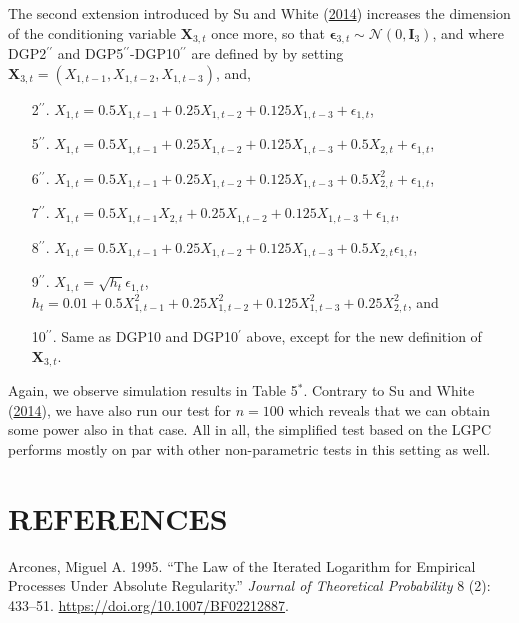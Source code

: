 \documentclass[
  12pt,
  letterpaper]{article}
\providecommand{\tightlist}{%
  \setlength{\itemsep}{0pt}\setlength{\parskip}{0pt}}
\numberwithin{equation}{section}
\newcommand{\X}{\bm{X}}
\newcommand{\fepsilon}{\bm{\epsilon}}
\begin{document}
The second extension introduced by Su and White (\protect\hyperlink{ref-su2014testing}{2014}) increases the dimension of the conditioning variable \(\X_{3,t}\) once more, so that \(\fepsilon_{3,t} \sim \mathcal{N}(0, \bm{I}_3)\), and where DGP2\(^{\prime\prime}\) and DGP5\(^{\prime\prime}\)-DGP10\(^{\prime\prime}\) are defined by by setting \(\X_{3,t} = (X_{1, t-1}, X_{1, t-2}, X_{1, t-3})\), and,

\begin{itemize}
\tightlist
\item[2$^{\prime\prime}$.] $X_{1,t} = 0.5X_{1,t-1} + 0.25X_{1, t-2} + 0.125X_{1,t-3} + \epsilon_{1,t}$,
\item[5$^{\prime\prime}$.] $X_{1,t} = 0.5X_{1,t-1} + 0.25X_{1, t-2} + 0.125X_{1,t-3} + 0.5X_{2,t} + \epsilon_{1,t}$,
\item[6$^{\prime\prime}$.] $X_{1,t} = 0.5X_{1,t-1} + 0.25X_{1, t-2} + 0.125X_{1,t-3} + 0.5X_{2,t}^2 + \epsilon_{1,t}$,
\item[7$^{\prime\prime}$.] $X_{1,t} = 0.5X_{1,t-1}X_{2, t} + 0.25X_{1,t-2} + 0.125X_{1,t-3} + \epsilon_{1,t}$,
\item[8$^{\prime\prime}$.] $X_{1,t} = 0.5X_{1,t-1} + 0.25X_{1,t-2} + 0.125X_{1,t-3} + 0.5X_{2, t}\epsilon_{1,t}$,
\item[9$^{\prime\prime}$.] $X_{1,t} = \sqrt{h_t}\epsilon_{1,t}$, $h_t = 0.01 + 0.5X_{1,t-1}^2 + 0.25X_{1,t-2}^2 + 0.125X_{1,t-3}^2 + 0.25X_{2,t}^2$, and
\item[10$^{\prime\prime}$.] Same as DGP10 and DGP10$^{\prime}$ above, except for the new definition of $\X_{3,t}$.
\end{itemize}



Again, we observe simulation results in Table 5\(^*\). Contrary to Su and White (\protect\hyperlink{ref-su2014testing}{2014}), we have also run our test for \(n=100\) which reveals that we can obtain some power also in that case. All in all, the simplified test based on the LGPC performs mostly on par with other non-parametric tests in this setting as well.

\newpage

\hypertarget{references}{%
\section*{REFERENCES}\label{references}}

\hypertarget{refs}{}
\leavevmode\hypertarget{ref-arcones1995law}{}%
Arcones, Miguel A. 1995. ``The Law of the Iterated Logarithm for Empirical Processes Under Absolute Regularity.'' \emph{Journal of Theoretical Probability} 8 (2): 433--51. \url{https://doi.org/10.1007/BF02212887}.
\end{document}
